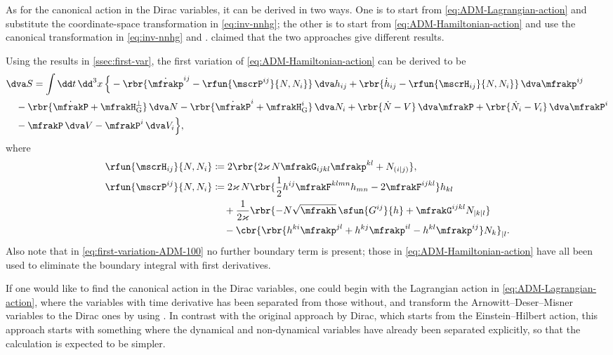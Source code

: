 \documentclass[a4paper,11pt]{article}
\begin{document}
As for the canonical action in the Dirac variables, it can be derived in two 
ways. One is to start from \cref{eq:ADM-Lagrangian-action} and substitute the 
coordinate-space transformation in \cref{eq:inv-nnhg}; the other is to start 
from \cref{eq:ADM-Hamiltonian-action} and use the canonical transformation in
\cref{eq:inv-nnhg} and . 
\citeauthor{Kiriushcheva2008} claimed \cite{Kiriushcheva2008} that the two 
approaches give different results.

Using the results in \cref{ssec:first-var}, the first variation of 
\cref{eq:ADM-Hamiltonian-action} can be derived to be
\begin{align}
&
\dva S = \int\dd t\,\dd^3 x \,\Big\{ -
\rbr{\dot{\mfrakp}^{ij} - \rfun{\mscrP^{ij}}{N, N_i}}\,\dva h_{ij} +
\rbr{\dot{h}_{ij} - \rfun{\mscrH_{ij}}{N, N_i}}\,\dva \mfrakp^{ij}
\nonumber \\
&\quad-
\rbr{\dot{\mfrakP} + \mfrakH_\text{G}^\perp}\,\dva N -
\rbr{\dot{\mfrakP}^i + \mfrakH_\text{G}^i}\,\dva N_i +
\rbr{\dot{N} - V}\,\dva \mfrakP + 
\rbr{\dot{N}_i - V_i}\,\dva \mfrakP^i
\nonumber \\
&\quad-
\mfrakP\,\dva V - \mfrakP^i\,\dva V_i
\Big\},
\label{eq:first-variation-ADM-100}
\end{align}
where
\begin{align}
\rfun{\mscrH_{ij}}{N, N_i} &\coloneqq
2\rbr{2\varkappa\,N\mfrakG_{ijkl}\mfrakp^{kl} + N_{(i|j)}},
\label{eq:mscrHij-100} \\
\rfun{\mscrP^{ij}}{N, N_i} &\coloneqq
2 \varkappa\,N\rbr{\frac{1}{2}h^{ij} \mfrakF^{klmn} h_{mn}
- 2 \mfrakF^{ijkl}} h_{kl}
\nonumber \\
&\quad\,
+\frac{1}{2\varkappa}
\rbr{-N\sqrt{\mfrakh}\,\sfun{G^{ij}}{h}
+\mfrakG^{ijkl} N_{|k|l}}
\nonumber \\
&\quad\,
-\cbr{\rbr{h^{ki}\mfrakp^{jl}+h^{kj}\mfrakp^{il}-h^{kl}\mfrakp^{ij}}N_k}_{|l}.
\label{eq:mscrPij-100}
\end{align}
Also note that in \cref{eq:first-variation-ADM-100} no further boundary term 
is present; those in \cref{eq:ADM-Hamiltonian-action} have all been used to 
eliminate the boundary integral with first derivatives.

If one would like to find the canonical action in the Dirac variables, one could 
begin with the Lagrangian action in \cref{eq:ADM-Lagrangian-action}, where the 
variables with time derivative has been separated from those without, and 
transform the Arnowitt--Deser--Misner variables to the Dirac ones by using 
. In contrast with the original approach by 
Dirac, which starts from the Einstein--Hilbert action, this approach starts with 
something where the dynamical and non-dynamical variables have already been 
separated explicitly, so that the calculation is expected to be simpler.
\end{document}
